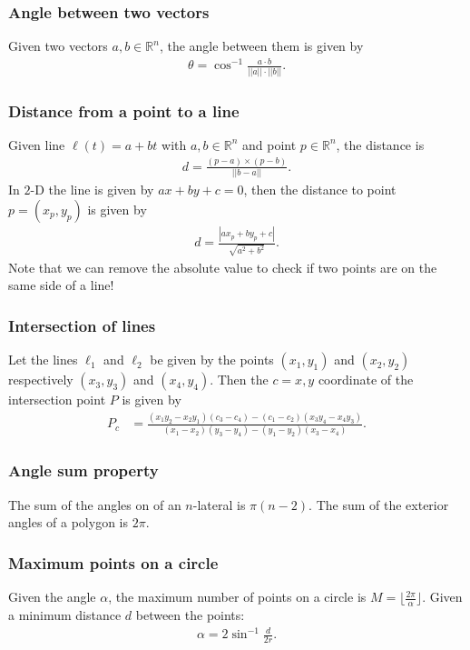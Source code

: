\subsubsection{Angle between two vectors}
Given two vectors $a, b \in \mathbb R^n$, the angle between them is given by
\begin{align*}
    \theta = \cos^{-1}\frac{a\cdot b}{||a||\cdot||b||}.
\end{align*}

\subsubsection{Distance from a point to a line}
Given line $\ell(t) = a + bt$ with $a, b \in \mathbb R^n$ and point $p \in \mathbb R^n$, the distance is
\begin{align*}
    d = \frac{(p - a) \times (p - b)}{||b - a||}.
\end{align*}
In $2$-D the line is given by $ax + by + c = 0$, then the distance to point $p = (x_p, y_p)$ is given by
\begin{align*}
    d = \frac{|ax_p + by_p + c|}{\sqrt{a^2 + b^2}}.
\end{align*}
Note that we can remove the absolute value to check if two points are on the same side of a line!

\subsubsection{Intersection of lines}
Let the lines $\ell_1$ and $\ell_2$ be given by the points $(x_1, y_1)$ and $(x_2, y_2)$ respectively $(x_3, y_3)$ and $(x_4, y_4)$. Then the $c = x, y$ coordinate of the intersection point $P$ is given by
\begin{align*}
    P_c &= \frac{(x_1y_2 - x_2y_1)(c_3 - c_4) - (c_1 - c_2)(x_3y_4 - x_4y_3)}{(x_1 - x_2)(y_3 - y_4) - (y_1 - y_2)(x_3 - x_4)}.
\end{align*}

\subsubsection{Angle sum property}
The sum of the angles on of an $n$-lateral is $\pi(n - 2)$. The sum of the exterior angles of a polygon is $2\pi$.

\subsubsection{Maximum points on a circle}
Given the angle $\alpha$, the maximum number of points on a circle is $M = \lfloor \frac{2\pi}\alpha\rfloor$. Given a minimum distance $d$ between the points:
\begin{align*}
    \alpha = 2 \sin^{-1} \frac d{2r}.
\end{align*}

